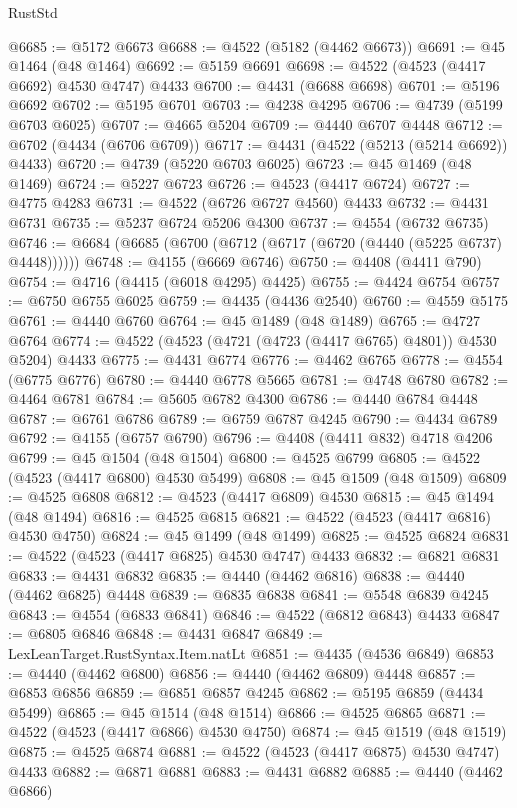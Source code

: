 \begin{lexlean}{RustStd}
\begin{coremodule}
@6685 := @5172 @6673
@6688 := @4522 (@5182 (@4462 @6673))
@6691 := @45 @1464 (@48 @1464)
@6692 := @5159 @6691
@6698 := @4522 (@4523 (@4417 @6692) @4530 @4747) @4433
@6700 := @4431 (@6688 @6698)
@6701 := @5196 @6692
@6702 := @5195 @6701
@6703 := @4238 @4295
@6706 := @4739 (@5199 @6703 @6025)
@6707 := @4665 @5204
@6709 := @4440 @6707 @4448
@6712 := @6702 (@4434 (@6706 @6709))
@6717 := @4431 (@4522 (@5213 (@5214 @6692)) @4433)
@6720 := @4739 (@5220 @6703 @6025)
@6723 := @45 @1469 (@48 @1469)
@6724 := @5227 @6723
@6726 := @4523 (@4417 @6724)
@6727 := @4775 @4283
@6731 := @4522 (@6726 @6727 @4560) @4433
@6732 := @4431 @6731
@6735 := @5237 @6724 @5206 @4300
@6737 := @4554 (@6732 @6735)
@6746 := @6684 (@6685 (@6700 (@6712 (@6717 (@6720 (@4440 (@5225 @6737) @4448))))))
@6748 := @4155 (@6669 @6746)
@6750 := @4408 (@4411 @790)
@6754 := @4716 (@4415 (@6018 @4295) @4425)
@6755 := @4424 @6754
@6757 := @6750 @6755 @6025
@6759 := @4435 (@4436 @2540)
@6760 := @4559 @5175
@6761 := @4440 @6760
@6764 := @45 @1489 (@48 @1489)
@6765 := @4727 @6764
@6774 := @4522 (@4523 (@4721 (@4723 (@4417 @6765) @4801)) @4530 @5204) @4433
@6775 := @4431 @6774
@6776 := @4462 @6765
@6778 := @4554 (@6775 @6776)
@6780 := @4440 @6778 @5665
@6781 := @4748 @6780
@6782 := @4464 @6781
@6784 := @5605 @6782 @4300
@6786 := @4440 @6784 @4448
@6787 := @6761 @6786
@6789 := @6759 @6787 @4245
@6790 := @4434 @6789
@6792 := @4155 (@6757 @6790)
@6796 := @4408 (@4411 @832) @4718 @4206
@6799 := @45 @1504 (@48 @1504)
@6800 := @4525 @6799
@6805 := @4522 (@4523 (@4417 @6800) @4530 @5499)
@6808 := @45 @1509 (@48 @1509)
@6809 := @4525 @6808
@6812 := @4523 (@4417 @6809) @4530
@6815 := @45 @1494 (@48 @1494)
@6816 := @4525 @6815
@6821 := @4522 (@4523 (@4417 @6816) @4530 @4750)
@6824 := @45 @1499 (@48 @1499)
@6825 := @4525 @6824
@6831 := @4522 (@4523 (@4417 @6825) @4530 @4747) @4433
@6832 := @6821 @6831
@6833 := @4431 @6832
@6835 := @4440 (@4462 @6816)
@6838 := @4440 (@4462 @6825) @4448
@6839 := @6835 @6838
@6841 := @5548 @6839 @4245
@6843 := @4554 (@6833 @6841)
@6846 := @4522 (@6812 @6843) @4433
@6847 := @6805 @6846
@6848 := @4431 @6847
@6849 := LexLeanTarget.RustSyntax.Item.natLt
@6851 := @4435 (@4536 @6849)
@6853 := @4440 (@4462 @6800)
@6856 := @4440 (@4462 @6809) @4448
@6857 := @6853 @6856
@6859 := @6851 @6857 @4245
@6862 := @5195 @6859 (@4434 @5499)
@6865 := @45 @1514 (@48 @1514)
@6866 := @4525 @6865
@6871 := @4522 (@4523 (@4417 @6866) @4530 @4750)
@6874 := @45 @1519 (@48 @1519)
@6875 := @4525 @6874
@6881 := @4522 (@4523 (@4417 @6875) @4530 @4747) @4433
@6882 := @6871 @6881
@6883 := @4431 @6882
@6885 := @4440 (@4462 @6866)

\end{coremodule}
\end{lexlean}
